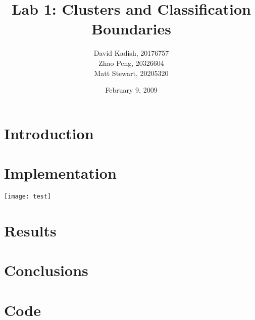 \documentclass{sydeStyle}
\title{Lab 1: Clusters and Classification Boundaries}
\author{
    David Kadish, 20176757\\
    Zhao Peng, 20326604\\
    Matt Stewart, 20205320\\
}
\date{February 9, 2009}
\begin{document}

\maketitle

\setcounter{page}{2} %


\chapter{Introduction}


\chapter{Implementation}

\texttt{[image: test]}

\chapter{Results}
\label{cha:results}


\chapter{Conclusions}


\appendix
\renewcommand{\thechapter}{\Alph{chapter}}

\chapter{Code}

\end{document}
